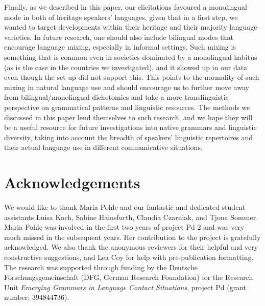 \documentclass[output=paper,colorlinks,citecolor=brown]{langscibook}
\begin{document}
Finally, as we described in this paper, our elicitations favoured a monolingual mode in both of heritage speakers’ languages, given that in a first step, we wanted to target developments within their heritage and their majority language varieties. In future research, one should also include bilingual modes that encourage language mixing, especially in informal settings. Such mixing is something that is common even in societies dominated by a monolingual habitus (as is the case in the countries we investigated), and it showed up in our data even though the set-up did not support this. This points to the normality of such mixing in natural language use and should encourage us to further move away from bilingual/monolingual dichotomies and take a more translinguistic perspective on grammatical patterns and linguistic resources. The methods we discussed in this paper lend themselves to such research, and we hope they will be a useful resource for future investigations into native grammars and linguistic diversity, taking into account the breadth of speakers’ linguistic repertoires and their actual language use in different communicative situations.

\section*{Acknowledgements}
We would like to thank Maria Pohle and our fantastic and dedicated student assistants Luisa Koch, Sabine Hainsfurth, Claudia Czarniak, and Tjona Sommer. Maria Pohle was involved in the first two years of project Pd-2 and was very much missed in the subsequent years. Her contribution to the project is gratefully acknowledged.
We also thank the anonymous reviewers for their helpful and very constructive suggestions, and Lea Coy for help with pre-publication formatting.
The research was supported through funding by the Deutsche Forschungsgemeinschaft (DFG, German Research Foundation) for the Research Unit \textit{Emerging Grammars in Language Contact Situations}, project Pd (grant number: 394844736).

{\sloppy\printbibliography[heading=subbibliography,notkeyword=this]}
\end{document}
